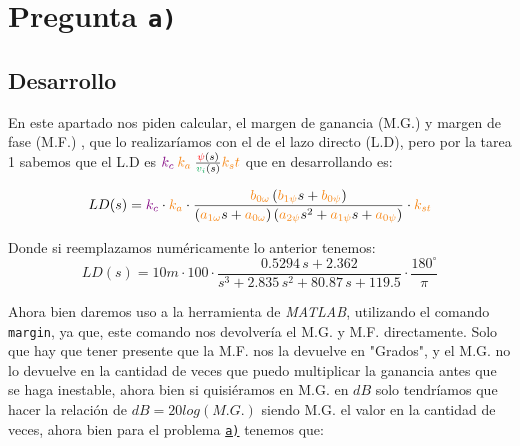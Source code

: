 \section{Pregunta \texttt{a)}}\label{pregunta-a}

\subsection{Desarrollo}

En este apartado nos piden calcular, el margen de ganancia (M.G.) y margen de fase (M.F.) , que lo realizaríamos con el de el lazo directo (L.D), pero por la tarea 1\cite{tarea-1-sdc} sabemos que el L.D es  \( \mora{k_c} \nara{ k_a} \frac{\rojo{\psi}(s)}{\verd{v_i}(s)}\nara{k_st} \) que en desarrollando es:


\begin{equation}
  LD(s) = \mora{k_c} \cdot \nara{k_a} \cdot \frac{\nara{b_{0\omega}} \left(\nara{b_{1\psi}}s + \nara{b_{0\psi}}\right)}
  {\left(\nara{a_{1\omega}}s + \nara{a_{0\omega}}\right)\left(\nara{a_{2\psi}}s^2 + \nara{a_{1\psi}}s + \nara{a_{0\psi}}\right)} \cdot \nara{k_{st}}
\end{equation}

Donde si reemplazamos numéricamente lo anterior tenemos: 
\begin{equation}
  LD(s) = 10m \cdot 100 \cdot \frac{0.5294 \, s + 2.362}{s^3 + 2.835 \, s^2 + 80.87 \, s + 119.5} \cdot \frac{180^{\circ}}{\pi}
\end{equation}

Ahora bien daremos uso a la herramienta de \textit{MATLAB}, utilizando el comando \verb|margin|, ya que, este comando nos devolvería el M.G. y M.F. directamente. Solo que hay que tener presente que la M.F. nos la devuelve en "Grados", y el M.G. no lo devuelve en la cantidad de veces que puedo multiplicar la ganancia antes que se haga inestable, ahora bien si quisiéramos en M.G. en $dB$ solo tendríamos que hacer la relación de \(dB = 20log(M.G.)\) siendo M.G. el valor en la cantidad de veces, ahora bien para el problema \hyperref[pregunta-a]{\texttt{a)}}  tenemos que:

\vspace*{0.25cm}


